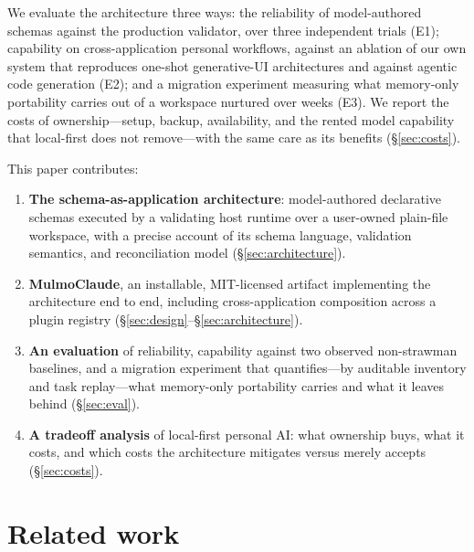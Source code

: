 \documentclass[11pt]{article}
\begin{document}
We evaluate the architecture three ways: the reliability of model-authored
schemas against the production validator, over three independent trials (E1);
capability on cross-application personal workflows, against an ablation of our
own system that reproduces one-shot generative-UI architectures \citep{jelly}
and against agentic code generation (E2); and a migration experiment measuring
what memory-only portability carries out of a workspace nurtured over weeks
(E3). We report the costs of ownership---setup, backup, availability, and the
rented model capability that local-first does not remove---with the same care as
its benefits (\S\ref{sec:costs}).

This paper contributes:

\begin{enumerate}
  \item \textbf{The schema-as-application architecture}: model-authored
  declarative schemas executed by a validating host runtime over a user-owned
  plain-file workspace, with a precise account of its schema language, validation
  semantics, and reconciliation model (\S\ref{sec:architecture}).
  \item \textbf{MulmoClaude}, an installable, MIT-licensed artifact implementing
  the architecture end to end, including cross-application composition across a
  plugin registry (\S\ref{sec:design}--\S\ref{sec:architecture}).
  \item \textbf{An evaluation} of reliability, capability against two observed
  non-strawman baselines, and a migration experiment that quantifies---by
  auditable inventory and task replay---what memory-only portability carries and
  what it leaves behind (\S\ref{sec:eval}).
  \item \textbf{A tradeoff analysis} of local-first personal AI: what ownership
  buys, what it costs, and which costs the architecture mitigates versus merely
  accepts (\S\ref{sec:costs}).
\end{enumerate}

\section{Related work}
\label{sec:related}
\end{document}
